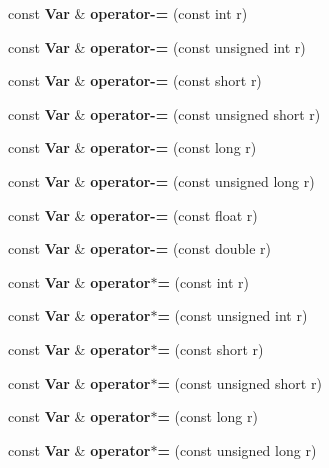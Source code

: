 \begin{CompactItemize}
\item 
const {\bf Var} \& \textbf{operator-=} (const int r)\label{classVar_382ee06269eb99897eb1fe7b067575ad}

\item 
const {\bf Var} \& \textbf{operator-=} (const unsigned int r)\label{classVar_410d018e99772280a94deb0c85f5330e}

\item 
const {\bf Var} \& \textbf{operator-=} (const short r)\label{classVar_8294fc348d32d71641911b7deac542a2}

\item 
const {\bf Var} \& \textbf{operator-=} (const unsigned short r)\label{classVar_ef605a3b98d7febea584aaf81e0b3903}

\item 
const {\bf Var} \& \textbf{operator-=} (const long r)\label{classVar_7b248e807849b1ed97f7c08d529c46ce}

\item 
const {\bf Var} \& \textbf{operator-=} (const unsigned long r)\label{classVar_bfbd07cfcdd0498e06fb4ce4e5732d23}

\item 
const {\bf Var} \& \textbf{operator-=} (const float r)\label{classVar_c6d15d50d55a4cdb0ee35887caf10455}

\item 
const {\bf Var} \& \textbf{operator-=} (const double r)\label{classVar_494194face36950b73461ac8d47e1b05}

\item 
const {\bf Var} \& \textbf{operator$\ast$=} (const int r)\label{classVar_d655335684c472a236c8c67a379094d5}

\item 
const {\bf Var} \& \textbf{operator$\ast$=} (const unsigned int r)\label{classVar_a14b6b2e99d98995acdeb20ba61eb6b9}

\item 
const {\bf Var} \& \textbf{operator$\ast$=} (const short r)\label{classVar_cb3c458d7659a58f83b48b4a59e48e14}

\item 
const {\bf Var} \& \textbf{operator$\ast$=} (const unsigned short r)\label{classVar_be4001dba23630ef0712b24e612d9d4f}

\item 
const {\bf Var} \& \textbf{operator$\ast$=} (const long r)\label{classVar_e41f41a5977f457fbdb2fe4133ed2397}

\item 
const {\bf Var} \& \textbf{operator$\ast$=} (const unsigned long r)\label{classVar_dda1593624bf331db944a0a81e152750}


\end{CompactItemize}
